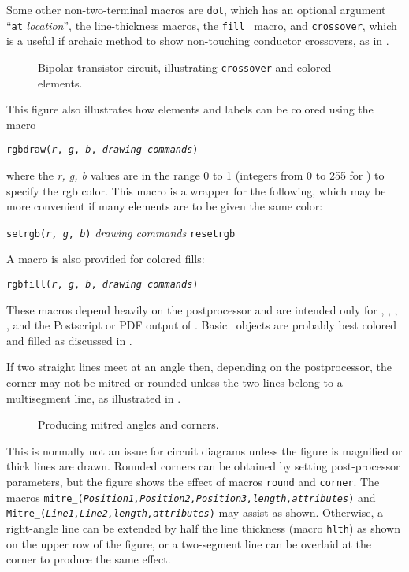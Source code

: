 Some other non-two-terminal macros are {\tt dot}, which has an
optional argument ``{\tt at} {\sl location}'', the line-thickness
macros, the {\tt fill\_} macro, and {\tt crossover}, which is a useful if
archaic method to show non-touching conductor crossovers, as in
.
\begin{figure}[h!t]
   
   \caption{Bipolar transistor circuit, illustrating {\tt crossover}
      and colored elements.}
   \label{bistable}
   \end{figure}

This figure also illustrates how elements and labels can be colored
using the macro
\par
{\tt rgbdraw({\sl r}, {\sl g}, {\sl b}, {\sl drawing commands})}
\par
\noindent
where the {\sl r, g, b} values are in the range 0 to 1
(integers from 0 to 255 for \SVG) to specify the rgb color.
This macro is a wrapper for the following, which may be more convenient
if many elements are to be given the same color:

   {\tt setrgb({\sl r}, {\sl g}, {\sl b})}
      \hfill\break\hspace*{\parindent}%
   {\sl drawing commands}
      \hfill\break\hspace*{\parindent}%
   {\tt resetrgb}

A macro is also provided for colored fills:

{\tt rgbfill({\sl r}, {\sl g}, {\sl b}, {\sl drawing commands})}

\noindent%
These macros depend heavily on the postprocessor and are intended only for 
\PSTricks, \TPGF, \MetaPost, \SVG, and the Postscript or PDF output of \dpic.
Basic \Pic\ objects are probably best colored and filled as discussed
in .

%
If two straight lines meet at an angle then, depending on the postprocessor,
the corner may not be mitred or rounded unless the two lines belong to
a multisegment line, as illustrated in .
\begin{figure}[ht]
   
   \caption{Producing mitred angles and corners.}
   \label{Corners}
   \end{figure}
This is normally
not an issue for circuit diagrams unless the figure is magnified or thick
lines are drawn.  Rounded corners can be obtained by setting post-processor
parameters, but the figure shows the effect of
macros {\tt round} and {\tt corner}.
The macros
{\tt mitre\_({\sl Position1,Position2,Position3,length,attributes})}
and
{\tt Mitre\_({\sl Line1,Line2,length,attributes})}
may assist as shown.
Otherwise, a right-angle line can be extended
by half the line thickness (macro {\tt hlth}) as shown on the upper row
of the figure,
or a two-segment line can be overlaid at the corner to produce the same effect.

